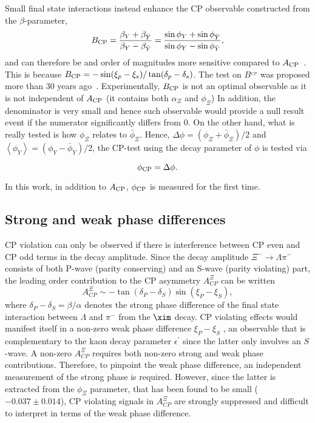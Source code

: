 Small final state interactions instead enhance the CP observable constructed from the $\beta$-parameter,  
\begin{equation}
    \label{beta}
    B_{\rm CP} = \frac{\beta_{Y} + \beta_{\bar{Y}}}{\beta_{Y}-\beta_{\bar{Y}}}=\frac{\sin\phi_{Y}+\sin\phi_{\bar{Y}}}{\sin\phi_{Y}-\sin\phi_{\bar{Y}}},
\end{equation}
and can therefore be and order of magnitudes more sensitive compared to $A_{\rm CP}$~\cite{JD85, JD86, MS08}. This is because $B_{\rm CP}=-\sin(\xi_p- \xi_s)/\tan(\delta_p -\delta_s)$.
The test on $B^_{CP}$ was proposed more than 30 years ago~\cite{JD85, JD86}. Experimentally, $B_{\rm CP}$ is not an optimal observable as it is not independent of $A_{\rm CP}$ (it contains both $\alpha_{\Xi}$ and $\phi_{\Xi}$) In addition, the denominator is very small and hence such observable would provide a null result event if the numerator significantly differs from $0$. On the other hand, what is really tested is how $\phi_{\Xi}$ relates to $\bar{\phi}_{\Xi}$. Hence, $\Delta\phi = (\phi_{\Xi} + \bar{\phi}_{\Xi})/2$ and $\left< \phi_{Y} \right> =  (\phi_{Y} - \bar{\phi}_{Y})/2$, the CP-test using the decay parameter of $\phi$ is tested via

\begin{equation}
    \label{deltaphi}
    \phi_{\rm CP} = \Delta\phi.
\end{equation}

In this work, in addition to $A_{\rm CP}$, $\phi_{\rm CP}$ is measured for the first time. 
\subsection{Strong and weak phase differences}
CP violation can only be observed if there is interference between CP even and CP odd terms in the decay amplitude. Since the decay amplitude $\Xi^- \to \Lambda \pi^-$ consists of both P-wave (parity conserving) and an S-wave (parity violating) part, the leading order contribution to the CP asymmetry $A_{CP}^{\Xi}$ can be written
    \begin{equation}
      A_{CP}^{\Xi}\sim - \tan(\delta_P - \delta_S)\sin(\xi_P - \xi_S),
      \label{eq:acpphase}
  \end{equation}
where $\delta_P-\delta_S = \beta/\alpha$ denotes the strong phase difference of the final state interaction between $\Lambda$ and $\pi^-$ from the $\xim$ decay. CP violating effects would manifest itself in a non-zero weak phase difference $\xi_P - \xi_S$  \cite{JD86}, an observable that is complementary to the kaon decay parameter $\epsilon^{'}$ 
since the latter only involves an $S$-wave. A non-zero $A_{CP}^{\Xi}$ requires both non-zero strong and weak phase contributions. Therefore,  to pinpoint the weak phase difference, an independent measurement of the strong phase is required. However, since the latter is extracted from the $\phi_\Xi$ parameter, that has been found to be small ($-0.037\pm0.014$\cite{MH04,PDG18}), CP violating signals in $A_{CP}^\Xi$ are strongly suppressed and difficult to interpret in terms of the weak phase difference.

